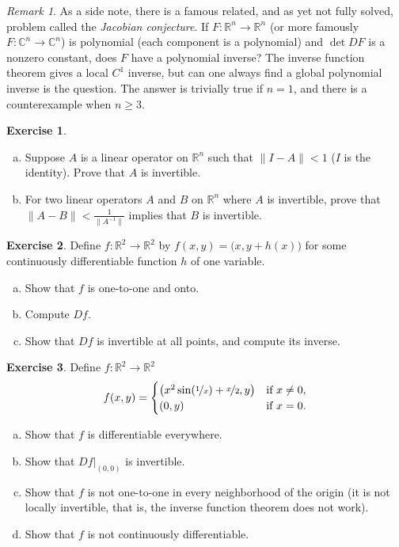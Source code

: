 \documentclass[12pt,openany]{book}
\newcommand{\snorm}[1]{\lVert {#1} \rVert}
\newcommand{\C}{{\mathbb{C}}}
\newcommand{\R}{{\mathbb{R}}}
\newcommand{\myindex}[1]{#1\index{#1}}
\theoremstyle{plain}
\theoremstyle{remark}
\newtheorem{remark}[thm]{Remark}
\theoremstyle{definition}
\newenvironment{exbox}{%
    \def\FrameCommand{\vrule width 1pt \relax\hspace{10pt}}%
    \MakeFramed{\advance\hsize-\width\FrameRestore}%
}{%
    \endMakeFramed
}
\newenvironment{exparts}{%
    \leavevmode\begin{enumerate}[a),noitemsep,topsep=0pt,parsep=0pt,partopsep=0pt]
}{%
    \end{enumerate}
}
\theoremstyle{exercise}
\newtheorem{exercise}{Exercise}[section]
\theoremstyle{example}
\begin{document}
\begin{remark}
As a side note, there is a famous related, and as yet not fully solved, problem
called the \emph{\myindex{Jacobian conjecture}}.  If $F \colon \R^n \to \R^n$
(or more famously $F \colon \C^n \to \C^n$)
is polynomial (each component is a polynomial) and $\det DF$ is a nonzero
constant, does $F$ have a polynomial inverse?
The inverse function theorem gives a local $C^1$ inverse, but can one always
find a global polynomial inverse is the question.
The answer is trivially true if $n=1$, and there is a counterexample
when $n \geq 3$.
\end{remark}

\begin{exbox}
\begin{exercise}
\begin{exparts}
\item
Suppose $A$ is a linear operator on $\R^n$ such that
$\snorm{I-A} < 1$ ($I$ is the identity). Prove that $A$ is invertible.
\item
For two linear operators $A$ and $B$ on $\R^n$ where $A$ is invertible,
prove that $\snorm{A-B} < \frac{1}{\snorm{A^{-1}}}$ implies that $B$ is
invertible.
\end{exparts}
\end{exercise}

\begin{exercise}
Define $f \colon \R^2 \to \R^2$ by $f(x,y) =
\bigl(x,y+h(x)\bigr)$ for some continuously differentiable function $h$ of one
variable.
\begin{exparts}
\item
Show that $f$ is one-to-one and onto.
\item
Compute $Df$.
\item
Show that $Df$ is invertible at all points, and compute
its inverse.
\end{exparts}
\end{exercise}

\begin{exercise}
Define $f \colon \R^2 \to \R^2$
\begin{equation*}
f(x,y) =
\begin{cases}
\bigl(x^2 \sin (\nicefrac{1}{x}) + \nicefrac{x}{2} , y \bigr) &
\text{if } x \neq 0, \\
(0,y) &
\text{if } x=0.
\end{cases}
\end{equation*}
\begin{exparts}
\item
Show that $f$ is differentiable everywhere.
\item
Show that $Df|_{(0,0)}$ is invertible.
\item
Show that $f$ is not one-to-one in every neighborhood of the origin (it is
not locally invertible, that is, the inverse function theorem does not work).
\item
Show that $f$ is not continuously differentiable.
\end{exparts}
\end{exercise}


\end{exbox}
\end{document}

